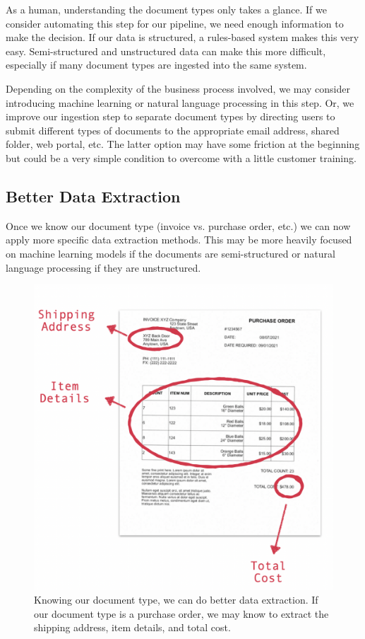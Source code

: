 \documentclass[conference]{IEEEtran}
\begin{document}
As a human, understanding the document types only takes a glance. If we consider automating this step for our pipeline, we need enough information to make the decision. If our data is structured, a rules-based system makes this very easy. Semi-structured and unstructured data can make this more difficult, especially if many document types are ingested into the same system. 

Depending on the complexity of the business process involved, we may consider introducing machine learning or natural language processing in this step. Or, we improve our ingestion step to separate document types by directing users to submit different types of documents to the appropriate email address, shared folder, web portal, etc. The latter option may have some friction at the beginning but could be a very simple condition to overcome with a little customer training.

\subsection{Better Data Extraction}
Once we know our document type (invoice vs. purchase order, etc.) we can now apply more specific data extraction methods. This may be more heavily focused on machine learning models if the documents are semi-structured or natural language processing if they are unstructured.

\begin{figure}[ht]
\centerline{\includegraphics[width=\columnwidth]{BetterDataExtraction.png}}
\caption{Knowing our document type, we can do better data extraction. If our document type is a purchase order, we may know to extract the shipping address, item details, and total cost.}
\label{figBetterDataExtraction}
\end{figure}
\end{document}
